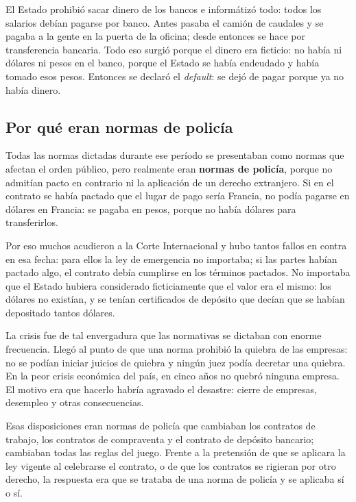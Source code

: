 \documentclass[12pt,oneside]{book}
\begin{document}
El Estado prohibi\'o sacar dinero de los bancos e inform\'atiz\'o todo: todos los salarios deb\'ian pagarse por banco. Antes pasaba el cami\'on de caudales y se pagaba a la gente en la puerta de la oficina; desde entonces se hace por transferencia bancaria. Todo eso surgi\'o porque el dinero era ficticio: no hab\'ia ni d\'olares ni pesos en el banco, porque el Estado se hab\'ia endeudado y hab\'ia tomado esos pesos. Entonces se declar\'o el \emph{default}: se dej\'o de pagar porque ya no hab\'ia dinero.

\subsection{Por qu\'e eran normas de polic\'ia}

Todas las normas dictadas durante ese per\'iodo se presentaban como normas que afectan el orden p\'ublico, pero realmente eran \textbf{normas de polic\'ia}, porque no admit\'ian pacto en contrario ni la aplicaci\'on de un derecho extranjero. Si en el contrato se hab\'ia pactado que el lugar de pago ser\'ia Francia, no pod\'ia pagarse en d\'olares en Francia: se pagaba en pesos, porque no hab\'ia d\'olares para transferirlos.

Por eso muchos acudieron a la Corte Internacional y hubo tantos fallos en contra en esa fecha: para ellos la ley de emergencia no importaba; si las partes hab\'ian pactado algo, el contrato deb\'ia cumplirse en los t\'erminos pactados. No importaba que el Estado hubiera considerado ficticiamente que el valor era el mismo: los d\'olares no exist\'ian, y se ten\'ian certificados de dep\'osito que dec\'ian que se hab\'ian depositado tantos d\'olares.

La crisis fue de tal envergadura que las normativas se dictaban con enorme frecuencia. Lleg\'o al punto de que una norma prohibi\'o la quiebra de las empresas: no se pod\'ian iniciar juicios de quiebra y ning\'un juez pod\'ia decretar una quiebra. En la peor crisis econ\'omica del pa\'is, en cinco a\~nos no quebr\'o ninguna empresa. El motivo era que hacerlo habr\'ia agravado el desastre: cierre de empresas, desempleo y otras consecuencias.

Esas disposiciones eran normas de polic\'ia que cambiaban los contratos de trabajo, los contratos de compraventa y el contrato de dep\'osito bancario; cambiaban todas las reglas del juego. Frente a la pretensi\'on de que se aplicara la ley vigente al celebrarse el contrato, o de que los contratos se rigieran por otro derecho, la respuesta era que se trataba de una norma de polic\'ia y se aplicaba s\'i o s\'i.
\end{document}
